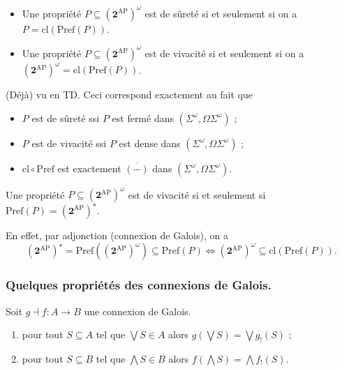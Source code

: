 \documentclass[./main]{subfiles}
\begin{document}
  \begin{crlr}
    \begin{itemize}
      \item Une propriété $P \subseteq (\mathbf{2}^\mathrm{AP})^\omega$ est de sûreté si et seulement si on a $P = \mathrm{cl}(\mathrm{Pref}(P))$.
      \item Une propriété $P \subseteq (\mathbf{2}^\mathrm{AP})^\omega$ est de vivacité si et seulement si on a $(\mathbf{2}^\mathrm{AP})^\omega = \mathrm{cl}(\mathrm{Pref}(P))$.
    \end{itemize} 
  \end{crlr}
  \begin{prv}
    (Déjà) vu en TD.
    Ceci correspond exactement au fait que 
    \begin{itemize}
      \item $P$ est de sûreté ssi $P$ est fermé dans $(\Sigma^\omega, \Omega \Sigma^\omega)$ ;
      \item $P$ est de vivacité ssi $P$ est dense dans $(\Sigma^\omega, \Omega \Sigma^\omega)$ ;
      \item $\mathrm{cl} \circ \mathrm{Pref}$ est exactement $\overline{(-)}$ dans $(\Sigma^\omega, \Omega \Sigma^\omega)$.
    \end{itemize}
  \end{prv}

  \begin{prop}
    Une propriété $P \subseteq (\mathbf{2}^\mathrm{AP})^\omega$ est de vivacité si et seulement si $\mathrm{Pref}(P) = (\mathbf{2}^\mathrm{AP})^\star$.
  \end{prop}
  \begin{prv}
    En effet, par adjonction (connexion de Galois),
    on a 
    \[
      (\mathbf{2}^\mathrm{AP})^\star = \mathrm{Pref}((\mathbf{2}^\mathrm{AP})^\omega) \subseteq \mathrm{Pref}(P)
      \iff (\mathbf{2}^\mathrm{AP})^\omega \subseteq \mathrm{cl}(\mathrm{Pref}(P))
    .\]
  \end{prv}

  \subsubsection{Quelques propriétés des connexions de Galois.}

  \begin{lem}
    Soit $g \dashv f : A \to B$ une connexion de Galois.
    \begin{enumerate}
      \item pour tout $S \subseteq A$ tel que $\bigvee S \in A$ alors $g(\bigvee S) = \bigvee g_!(S)$ ;
      \item pour tout $S \subseteq B$ tel que $\bigwedge S \in B$ alors $f(\bigwedge S) = \bigwedge f_!(S)$.
    \end{enumerate}
  \end{lem}
\end{document}
